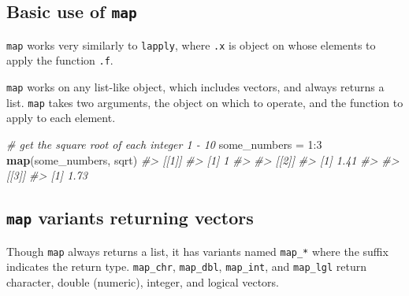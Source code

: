 \documentclass[]{book}
\newenvironment{Shaded}{}{}
\newcommand{\CommentTok}[1]{\textcolor[rgb]{0.38,0.63,0.69}{\textit{#1}}}
\newcommand{\DataTypeTok}[1]{\textcolor[rgb]{0.56,0.13,0.00}{#1}}
\newcommand{\DecValTok}[1]{\textcolor[rgb]{0.25,0.63,0.44}{#1}}
\newcommand{\KeywordTok}[1]{\textcolor[rgb]{0.00,0.44,0.13}{\textbf{#1}}}
\newcommand{\NormalTok}[1]{#1}
\newcommand{\OperatorTok}[1]{\textcolor[rgb]{0.40,0.40,0.40}{#1}}
\newcommand{\StringTok}[1]{\textcolor[rgb]{0.25,0.44,0.63}{#1}}
\begin{document}
\hypertarget{basic-use-of-map}{%
\subsection{\texorpdfstring{Basic use of \texttt{map}}{Basic use of map}}\label{basic-use-of-map}}

\texttt{map} works very similarly to \texttt{lapply}, where \texttt{.x} is object on whose elements to apply the function \texttt{.f}.

\begin{Shaded}
\end{Shaded}

\texttt{map} works on any list-like object, which includes vectors, and always returns a list. \texttt{map} takes two arguments, the object on which to operate, and the function to apply to each element.

\begin{Shaded}
\begin{Highlighting}[]
\CommentTok{# get the square root of each integer 1 - 10}
\NormalTok{some_numbers =}\StringTok{ }\DecValTok{1}\OperatorTok{:}\DecValTok{3}
\KeywordTok{map}\NormalTok{(some_numbers, sqrt)}
\CommentTok{#> [[1]]}
\CommentTok{#> [1] 1}
\CommentTok{#> }
\CommentTok{#> [[2]]}
\CommentTok{#> [1] 1.41}
\CommentTok{#> }
\CommentTok{#> [[3]]}
\CommentTok{#> [1] 1.73}
\end{Highlighting}
\end{Shaded}

\hypertarget{map-variants-returning-vectors}{%
\subsection{\texorpdfstring{\texttt{map} variants returning vectors}{map variants returning vectors}}\label{map-variants-returning-vectors}}

Though \texttt{map} always returns a list, it has variants named \texttt{map\_*} where the suffix indicates the return type.
\texttt{map\_chr}, \texttt{map\_dbl}, \texttt{map\_int}, and \texttt{map\_lgl} return character, double (numeric), integer, and logical vectors.
\end{document}
